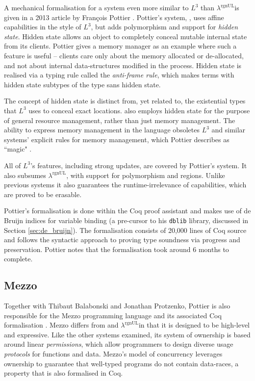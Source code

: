 \documentclass[]{unswthesis}
\newcommand{\rgnUL}{$\lambda^\text{rgnUL}$\text{ }}
\newcommand{\SSPHS}{\text{SSPHS }}
\begin{document}
A mechanical formalisation for a system even more similar to $L^3$ than \rgnUL is given in a 2013 article by Fran\c{c}ois Pottier \cite{pottier13}. Pottier's system, \SSPHS, uses affine capabilities in the style of $L^3$, but adds polymorphism and support for \textit{hidden state}. Hidden state allows an object to completely conceal mutable internal state from its clients. Pottier gives a memory manager as an example where such a feature is useful -- clients care only about the memory allocated or de-allocated, and not about internal data-structures modified in the process. Hidden state is realised via a typing rule called the \textit{anti-frame rule}, which makes terms with hidden state subtypes of the type sans hidden state.

The concept of hidden state is distinct from, yet related to, the existential types that $L^3$ uses to conceal exact locations. \SSPHS also employs hidden state for the purpose of general resource management, rather than just memory management. The ability to express memory management in the language obsoletes $L^3$ and similar systems' explicit rules for memory management, which Pottier describes as ``magic" \cite{pottier13}.

All of $L^3$'s features, including strong updates, are covered by Pottier's system. It also subsumes \rgnUL, with support for polymorphism and regions. Unlike previous systems it also guarantees the runtime-irrelevance of capabilities, which are proved to be erasable.

Pottier's formalisation is done within the Coq proof assistant and makes use of de Bruijn indices for variable binding (a pre-cursor to his \texttt{dblib} library, discussed in Section \ref{sec:de_bruijn}). The formalisation consists of 20,000 lines of Coq source and follows the syntactic approach to proving type soundness via progress and preservation. Pottier notes that the formalisation took around 6 months to complete.

\subsection{Mezzo}

Together with Thibaut Balabonski and Jonathan Protzenko, Pottier is also responsible for the Mezzo programming language and its associated Coq formalisation \cite{mezzo14}. Mezzo differs from \SSPHS and \rgnUL in that it is designed to be high-level and expressive. Like the other systems examined, its system of ownership is based around linear \textit{permissions}, which allow programmers to design diverse usage \textit{protocols} for functions and data. Mezzo's model of concurrency leverages ownership to guarantee that well-typed programs do not contain data-races, a property that is also formalised in Coq.
\end{document}
